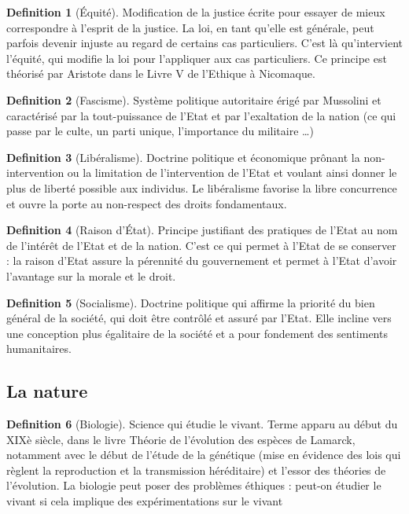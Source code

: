 \documentclass[french]{book}
\theoremstyle{definition}
\newtheorem*{dfn}{Definition}
\begin{document}
\begin{dfn}[Équité]
Modification de la justice écrite pour essayer de mieux correspondre à l’esprit de la justice. La loi, en tant qu’elle est générale, peut parfois devenir injuste au regard de certains cas particuliers. C’est là qu’intervient l’équité, qui modifie la loi pour l'appliquer aux cas particuliers. Ce principe est théorisé par Aristote dans le Livre V de l’Ethique à Nicomaque.
\end{dfn}

\begin{dfn}[Fascisme]
Système politique autoritaire érigé par Mussolini et caractérisé par la tout-puissance de l’Etat et par l’exaltation de la nation (ce qui passe par le culte, un parti unique, l’importance du militaire …)
\end{dfn}

\begin{dfn}[Libéralisme]
Doctrine politique et économique prônant la non-intervention ou la limitation de l'intervention de l’Etat et voulant ainsi donner le plus de liberté possible aux individus. Le libéralisme favorise la libre concurrence et ouvre la porte au non-respect des droits fondamentaux.
\end{dfn}


\begin{dfn}[Raison d’État] 
Principe justifiant des pratiques de l’Etat au nom de l’intérêt de l’Etat et de la nation. C’est ce qui permet à l’Etat de se conserver : la raison d’Etat assure la pérennité du gouvernement et permet à l’Etat d’avoir l’avantage sur la morale et le droit.
\end{dfn}

\begin{dfn}[Socialisme]
Doctrine politique qui affirme la priorité du bien général de la société, qui doit être contrôlé et assuré par l’Etat. Elle incline vers une conception plus égalitaire de la société et a pour fondement des sentiments humanitaires.
\end{dfn}

\subsection{La nature}

\begin{dfn}[Biologie]
Science qui étudie le vivant. Terme apparu au début du XIXè siècle, dans le livre Théorie de l’évolution des espèces de Lamarck, notamment avec le début de l’étude de la génétique (mise en évidence des lois qui règlent la reproduction et la transmission héréditaire) et l’essor des théories de l’évolution. La biologie peut poser des problèmes éthiques : peut-on étudier le vivant si cela implique des expérimentations sur le vivant
\end{dfn}
\end{document}
